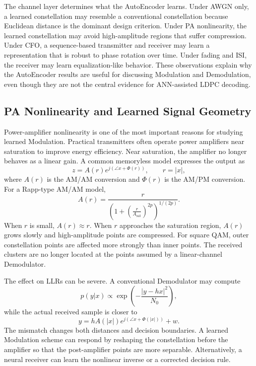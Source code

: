 The channel layer determines what the AutoEncoder learns. Under AWGN only, a learned constellation may resemble a conventional constellation because Euclidean distance is the dominant design criterion. Under PA nonlinearity, the learned constellation may avoid high-amplitude regions that suffer compression. Under CFO, a sequence-based transmitter and receiver may learn a representation that is robust to phase rotation over time. Under fading and ISI, the receiver may learn equalization-like behavior. These observations explain why the AutoEncoder results are useful for discussing Modulation and Demodulation, even though they are not the central evidence for ANN-assisted LDPC decoding.

\subsection{PA Nonlinearity and Learned Signal Geometry}
Power-amplifier nonlinearity is one of the most important reasons for studying learned Modulation. Practical transmitters often operate power amplifiers near saturation to improve energy efficiency. Near saturation, the amplifier no longer behaves as a linear gain. A common memoryless model expresses the output as
\begin{equation}
  z=A(r)e^{j(\angle x+\Phi(r))}, \qquad r=|x|,
\end{equation}
where $A(r)$ is the AM/AM conversion and $\Phi(r)$ is the AM/PM conversion. For a Rapp-type AM/AM model,
\begin{equation}
  A(r)=\frac{r}{\left(1+\left(\frac{r}{A_{\mathrm{sat}}}\right)^{2p}\right)^{1/(2p)}}.
\end{equation}
When $r$ is small, $A(r)\approx r$. When $r$ approaches the saturation region, $A(r)$ grows slowly and high-amplitude points are compressed. For square QAM, outer constellation points are affected more strongly than inner points. The received clusters are no longer located at the points assumed by a linear-channel Demodulator.

The effect on LLRs can be severe. A conventional Demodulator may compute
\begin{equation}
  p(y|x)\propto \exp\left(-\frac{|y-hx|^2}{N_0}\right),
\end{equation}
while the actual received sample is closer to
\begin{equation}
  y=hA(|x|)e^{j(\angle x+\Phi(|x|))}+w.
\end{equation}
The mismatch changes both distances and decision boundaries. A learned Modulation scheme can respond by reshaping the constellation before the amplifier so that the post-amplifier points are more separable. Alternatively, a neural receiver can learn the nonlinear inverse or a corrected decision rule.

